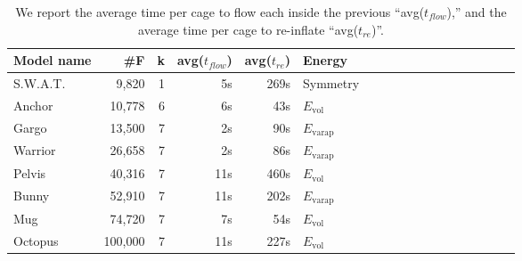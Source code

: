\begin{table}
\centering
{}
\setlength{\tabcolsep}{5.5pt}
\begin{tabular}{l r r r r l r r r r r r r r r r r r}
\rowcolor{white}
Model name  & \#F & k & avg($t_{flow}$) & avg($t_{re}$) & Energy\\
\midrule
S.W.A.T. & 9,820 & 1 & 5s & 269s & Symmetry \\
Anchor & 10,778 & 6 & 6s & 43s & $E_\text{vol}$ \\
Gargo & 13,500 & 7 & 2s & 90s & $E_\text{varap}$\\
Warrior & 26,658 & 7 & 2s & 86s & $E_\text{varap}$  \\
Pelvis & 40,316 & 7 & 11s & 460s & $E_\text{vol}$  \\
Bunny & 52,910 & 7 & 11s & 202s & $E_\text{varap}$ \\
Mug & 74,720 & 7 & 7s & 54s & $E_\text{vol}$ \\
Octopus & 100,000 & 7 & 11s & 227s & $E_\text{vol}$ \\
\bottomrule
\end{tabular}
\caption{
We report the average time per cage to flow each inside the 
previous ``avg($t_{flow}$),'' and the average time per cage to re-inflate
``avg($t_{re}$)''.}
\label{tab:timings}
\end{table}
